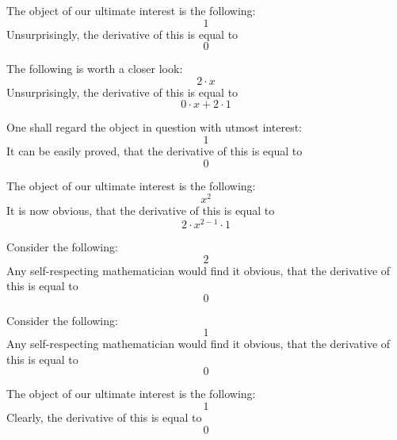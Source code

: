 \documentclass{article}
\begin{document}
The object of our ultimate interest is the following:
\begin{equation}
1 
\end{equation}
Unsurprisingly, the derivative of this is equal to
\begin{equation}
0 
\end{equation}

The following is worth a closer look:
\begin{equation}
2 \cdot x 
\end{equation}
Unsurprisingly, the derivative of this is equal to
\begin{equation}
0 \cdot x + 2 \cdot 1 
\end{equation}

One shall regard the object in question with utmost interest:
\begin{equation}
1 
\end{equation}
It can be easily proved, that the derivative of this is equal to
\begin{equation}
0 
\end{equation}

The object of our ultimate interest is the following:
\begin{equation}
x ^{2 } 
\end{equation}
It is now obvious, that the derivative of this is equal to
\begin{equation}
2 \cdot x ^{2 - 1 } \cdot 1 
\end{equation}

Consider the following:
\begin{equation}
2 
\end{equation}
Any self-respecting mathematician would find it obvious, that the derivative of this is equal to
\begin{equation}
0 
\end{equation}

Consider the following:
\begin{equation}
1 
\end{equation}
Any self-respecting mathematician would find it obvious, that the derivative of this is equal to
\begin{equation}
0 
\end{equation}

The object of our ultimate interest is the following:
\begin{equation}
1 
\end{equation}
Clearly, the derivative of this is equal to
\begin{equation}
0 
\end{equation}
\end{document}
